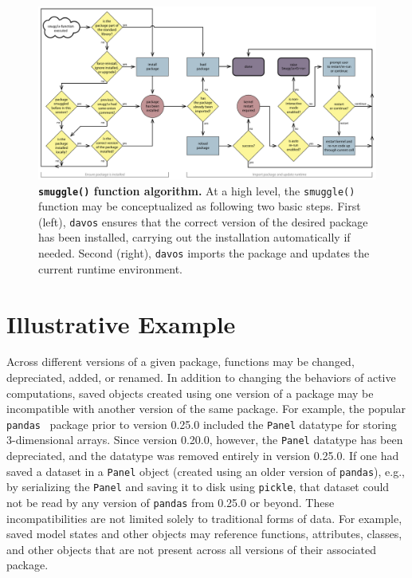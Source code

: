 \documentclass[preprint,12pt,a4paper]{elsarticle}
\begin{document}
\begin{figure}[tp]
\centering
\includegraphics[width=\textwidth]{figs/flow_chart}
\caption{\small \textbf{\texttt{smuggle()} function algorithm.}  At a
  high level, the \texttt{smuggle()} function may be conceptualized as
following two basic steps.  First (left), \texttt{davos} ensures that the
correct version of the desired package has been installed, carrying
out the installation automatically if needed.  Second (right),
\texttt{davos} imports the package and updates the current runtime environment.}
\label{fig:flow-chart}
\end{figure}


\section{Illustrative Example}\label{sec:illustrative-example}



Across different versions of a given package, functions may be
changed, depreciated, added, or renamed.  In addition to changing the
behaviors of active computations, saved objects created using one
version of a package may be incompatible with another version of the
same package.  For example, the popular \texttt{pandas}~\cite{McKi10}
package prior to version 0.25.0 included the \texttt{Panel} datatype
for storing 3-dimensional arrays.  Since version 0.20.0,
however, the \texttt{Panel} datatype has been depreciated, and the
datatype was removed entirely in version 0.25.0.  If one had saved a dataset in a
\texttt{Panel} object (created using an older version of
\texttt{pandas}), e.g., by serializing the \texttt{Panel} and saving
it to disk using \texttt{pickle}, that dataset could not be read by
any version of \texttt{pandas} from 0.25.0 or beyond.  These
incompatibilities are not limited solely to traditional forms of data.
For example, saved model states and other objects may reference
functions, attributes, classes, and other objects that are not present
across all versions of their associated package.
\end{document}
